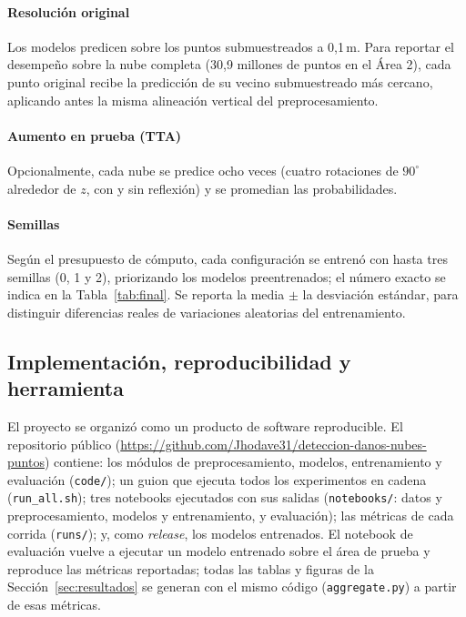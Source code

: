 \documentclass[5p]{elsarticle}
\begin{document}
\paragraph{Resolución original} Los modelos predicen sobre los puntos submuestreados a 0,1\,m. Para reportar el desempeño sobre la nube completa (30,9 millones de puntos en el Área 2), cada punto original recibe la predicción de su vecino submuestreado más cercano, aplicando antes la misma alineación vertical del preprocesamiento.

\paragraph{Aumento en prueba (TTA)} Opcionalmente, cada nube se predice ocho veces (cuatro rotaciones de $90^\circ$ alrededor de $z$, con y sin reflexión) y se promedian las probabilidades.

\paragraph{Semillas} Según el presupuesto de cómputo, cada configuración se entrenó con hasta tres semillas (0, 1 y 2), priorizando los modelos preentrenados; el número exacto se indica en la Tabla~\ref{tab:final}. Se reporta la media $\pm$ la desviación estándar, para distinguir diferencias reales de variaciones aleatorias del entrenamiento.

\subsection{Implementación, reproducibilidad y herramienta}\label{sec:impl}

El proyecto se organizó como un producto de software reproducible. El repositorio público (\url{https://github.com/Jhodave31/deteccion-danos-nubes-puntos}) contiene: los módulos de preprocesamiento, modelos, entrenamiento y evaluación (\texttt{code/}); un guion que ejecuta todos los experimentos en cadena (\texttt{run\_all.sh}); tres notebooks ejecutados con sus salidas (\texttt{notebooks/}: datos y preprocesamiento, modelos y entrenamiento, y evaluación); las métricas de cada corrida (\texttt{runs/}); y, como \emph{release}, los modelos entrenados. El notebook de evaluación vuelve a ejecutar un modelo entrenado sobre el área de prueba y reproduce las métricas reportadas; todas las tablas y figuras de la Sección~\ref{sec:resultados} se generan con el mismo código (\texttt{aggregate.py}) a partir de esas métricas.
\end{document}
